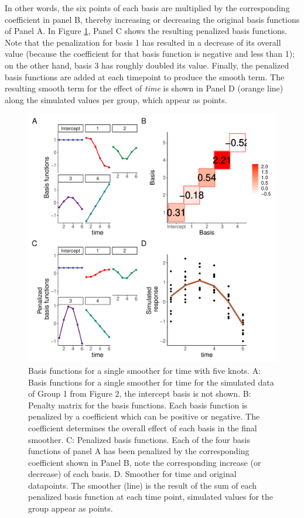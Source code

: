 \documentclass[
]{article}
\begin{document}
In other words, the six points of each basis are multiplied by the corresponding coefficient in panel B, thereby increasing or decreasing the original basis functions of Panel A. In Figure \ref{fig:basis-plot}, Panel C shows the resulting penalized basis functions. Note that the penalization for basis 1 has resulted in a decrease of its overall value (because the coefficient for that basis function is negative and less than 1); on the other hand, basis 3 has roughly doubled its value. Finally, the penalized basis functions are added at each timepoint to produce the smooth term. The resulting smooth term for the effect of \emph{time} is shown in Panel D (orange line) along the simulated values per group, which appear as points.

\begin{figure}[!h]

{\centering \includegraphics[width=0.75\linewidth,]{Manuscript_AM_v4_files/figure-latex/basis-plot-1} 

}

\caption{Basis functions for a single smoother for time with five knots. A: Basis functions for a single smoother for time for the simulated data of Group 1 from Figure 2, the intercept basis is not shown. B: Penalty matrix for the basis functions. Each basis function is penalized by a coefficient which can be positive or negative. The coefficient determines the overall effect of each basis in the final smoother. C: Penalized basis functions. Each of the four basis functions of panel A has been penalized by the corresponding coefficient shown in Panel B, note the corresponding increase (or decrease) of each basis. D. Smoother for time and original datapoints. The smoother (line) is the result of the sum of each penalized basis function at each time point, simulated values for the group appear as points.}\label{fig:basis-plot}
\end{figure}
\end{document}
